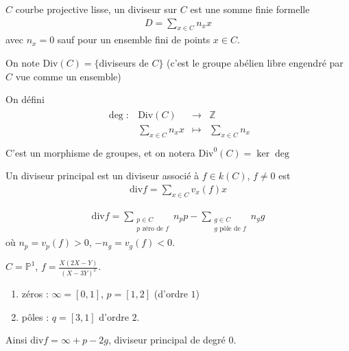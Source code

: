        \begin{defi}
            $C$ courbe projective lisse, un diviseur sur $C$ est une somme finie formelle
            \begin{align*}
                D = \sum_{x \in C} n_xx
            \end{align*}
            avec $n_x = 0$ sauf pour un ensemble fini de points $x \in C$.
        \end{defi}
        \begin{nota}
            On note $\mathrm{Div}(C) = \{$diviseurs de $C\}$ (c'est le groupe abélien libre engendré par $C$ vue comme un ensemble)
        \end{nota}
        \begin{nota}
            On défini
            \begin{align*}
                \begin{array}{cccc}
                    \deg : & \mathrm{Div}(C) & \to & \mathbb{Z} \\
                    & \sum_{x \in C} n_xx & \mapsto & \sum_{x \in C} n_x \\
                \end{array}
            \end{align*}
            C'est un morphisme de groupes, et on notera $\mathrm{Div}^0(C) = \ker \deg$
        \end{nota}
        \begin{defi}
            Un diviseur principal est un diviseur associé à $f \in k(C)$, $f \neq 0$ est 
            \begin{align*}
                \mathrm{div} f = \sum_{x \in C} v_x(f)x
            \end{align*}
        \end{defi}
        \begin{remq}
            \begin{align*}
                \mathrm{div} f = \sum_{\substack{p \in C \\ p \text{ zéro de } f}} n_pp - \sum_{\substack{g \in C \\ g \text{ pôle de } f}} n_gg
            \end{align*}
            où $n_p = v_p(f) > 0$, $-n_g = v_g(f) < 0$. 
        \end{remq}
        \begin{expl}
            $C = \mathbb{P}^1$, $f = \frac{X(2X - Y)}{(X - 3Y)^2}$.
            \begin{enumerate}
                \item zéros : $\infty = [0,1]$, $p = [1,2]$ (d'ordre $1$)
                \item pôles : $q = [3,1]$ d'ordre $2$.
            \end{enumerate}
            Ainsi $\mathrm{div} f = \infty + p - 2g$, diviseur principal de degré $0$.
        \end{expl}
